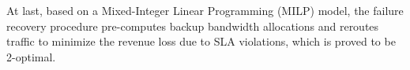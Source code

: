 \documentclass[sigconf]{acmart}
\begin{document}
At last, based on a Mixed-Integer Linear Programming (MILP) model, the failure recovery procedure pre-computes backup bandwidth allocations and reroutes traffic to minimize the revenue loss due to SLA violations, which is proved to be 2-optimal. 
\end{document}
